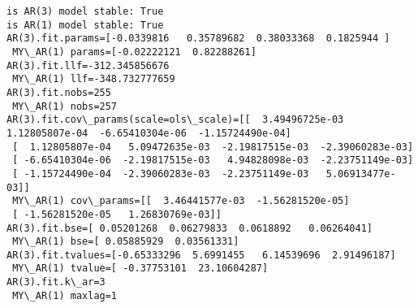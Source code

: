 \documentclass{article}
\begin{document}
    \begin{Verbatim}[commandchars=\\\{\}]
is AR(3) model stable: True
is AR(1) model stable: True
AR(3).fit.params=[-0.0339816   0.35789682  0.38033368  0.1825944 ] 
 MY\_AR(1) params=[-0.02222121  0.82288261] 
AR(3).fit.llf=-312.345856676 
 MY\_AR(1) llf=-348.732777659 
AR(3).fit.nobs=255 
 MY\_AR(1) nobs=257 
AR(3).fit.cov\_params(scale=ols\_scale)=[[  3.49496725e-03   1.12805807e-04  -6.65410304e-06  -1.15724490e-04]
 [  1.12805807e-04   5.09472635e-03  -2.19817515e-03  -2.39060283e-03]
 [ -6.65410304e-06  -2.19817515e-03   4.94828098e-03  -2.23751149e-03]
 [ -1.15724490e-04  -2.39060283e-03  -2.23751149e-03   5.06913477e-03]] 
 MY\_AR(1) cov\_params=[[  3.46441577e-03  -1.56281520e-05]
 [ -1.56281520e-05   1.26830769e-03]] 
AR(3).fit.bse=[ 0.05201268  0.06279833  0.0618892   0.06264041] 
 MY\_AR(1) bse=[ 0.05885929  0.03561331] 
AR(3).fit.tvalues=[-0.65333296  5.6991455   6.14539696  2.91496187] 
 MY\_AR(1) tvalue=[ -0.37753101  23.10604287] 
AR(3).fit.k\_ar=3 
 MY\_AR(1) maxlag=1
    \end{Verbatim}
\end{document}
